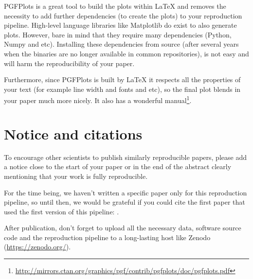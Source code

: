 \documentclass{article}
\begin{document}
\begin{multicols}{2}
PGFPlots is a great tool to build the plots within \LaTeX{} and removes the
necessity to add further dependencies (to create the plots) to your
reproduction pipeline. High-level language libraries like Matplotlib do
exist to also generate plots. However, bare in mind that they require many
dependencies (Python, Numpy and etc). Installing these dependencies from
source (after several years when the binaries are no longer available in
common repositories), is not easy and will harm the reproducibility of your
paper.

\begin{Figure}

\end{Figure}

Furthermore, since PGFPlots is built by \LaTeX{} it respects all the
properties of your text (for example line width and fonts and etc), so the
final plot blends in your paper much more nicely. It also has a wonderful
manual\footnote{\url{http://mirrors.ctan.org/graphics/pgf/contrib/pgfplots/doc/pgfplots.pdf}}.


\section{Notice and citations}
To encourage other scientists to publish similarly reproducible papers,
please add a notice close to the start of your paper or in the end of the
abstract clearly mentioning that your work is fully reproducible.

For the time being, we haven't written a specific paper only for this
reproduction pipeline, so until then, we would be grateful if you could
cite the first paper that used the first version of this pipeline:
\citet{ai15}.

After publication, don't forget to upload all the necessary data, software
source code and the reproduction pipeline to a long-lasting host like
Zenodo (\url{https://zenodo.org/}).




\printbibliography
\end{multicols}
\end{document}
